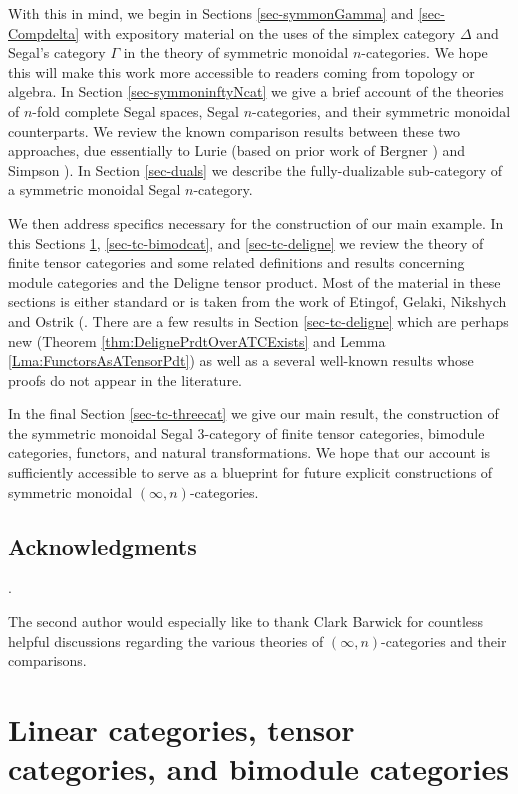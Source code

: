 \documentclass{amsart}
\begin{document}
With this in mind, we begin in Sections \ref{sec-symmonGamma} and \ref{sec-Compdelta} with expository material on the uses of the simplex category $\Delta$ and Segal's category $\Gamma$ in the theory of symmetric monoidal $n$-categories. We hope this will make this work more accessible to readers coming from topology or algebra. In Section \ref{sec-symmoninftyNcat} we give a brief account of the theories of $n$-fold complete Segal spaces, Segal $n$-categories, and their symmetric monoidal counterparts. We review the known comparison results between these two approaches, due essentially to Lurie \cite{0905.0462} (based on prior work of Bergner \cite{MR2321038}) and Simpson \cite{1001.4071}). In Section \ref{sec-duals} we describe the fully-dualizable sub-category of a symmetric monoidal Segal $n$-category. 

We then address specifics necessary for the construction of our main example. In this Sections \ref{sec-tc-lincat}, \ref{sec-tc-bimodcat}, and \ref{sec-tc-deligne} we review the theory of finite tensor categories and some related definitions and results concerning module categories and the Deligne tensor product.  Most of the material in these sections is either standard or is taken from the work of Etingof, Gelaki, Nikshych and Ostrik (\cite{MR1976459,MR2183279,MR2097289, 0909.3140, EGNO}.  There are a few results in Section \ref{sec-tc-deligne} which are perhaps new (Theorem \ref{thm:DelignePrdtOverATCExists} and Lemma \ref{Lma:FunctorsAsATensorPdt}) as well as a several well-known results whose proofs do not appear in the literature. 

In the final Section \ref{sec-tc-threecat} we give our main result, the construction of the symmetric monoidal Segal 3-category of finite tensor categories,  bimodule categories, functors, and natural transformations. We hope that our account is sufficiently accessible to serve as a blueprint for future explicit constructions of  symmetric monoidal $(\infty,n)$-categories. 


\subsection*{Acknowledgments}.

The second author would especially like to thank Clark Barwick for countless helpful discussions regarding the various theories of $(\infty,n)$-categories and their comparisons. 

\section{Linear categories, tensor categories, and bimodule categories} \label{sec-tc-lincat}
\end{document}
